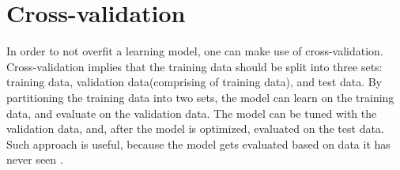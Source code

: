 \section{Cross-validation}
In order to not overfit a learning model, one can make use of cross-validation. Cross-validation implies that the training data should be split into three sets: training data, validation data(comprising of training data), and test data. By partitioning the training data into two sets, the model can learn on the training data, and evaluate on the validation data. The model can be tuned with the validation data, and, after the model is optimized, evaluated on the test data. Such approach is useful, because the model gets evaluated based on data it has never seen \cite{scikit-learn}.







